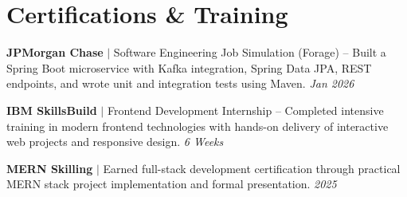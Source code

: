 \documentclass[10pt,a4paper]{article}
\begin{document}
\section*{Certifications \& Training}

\textbf{JPMorgan Chase} \enspace $|$ \enspace Software Engineering Job Simulation (Forage) -- Built a Spring Boot microservice with Kafka integration, Spring Data JPA, REST endpoints, and wrote unit and integration tests using Maven. \hfill \textit{Jan 2026}

\vspace{5pt}

\textbf{IBM SkillsBuild} \enspace $|$ \enspace Frontend Development Internship -- Completed intensive training in modern frontend technologies with hands-on delivery of interactive web projects and responsive design. \hfill \textit{6 Weeks}

\vspace{5pt}

\textbf{MERN Skilling} \enspace $|$ \enspace Earned full-stack development certification through practical MERN stack project implementation and formal presentation. \hfill \textit{2025}
\end{document}

